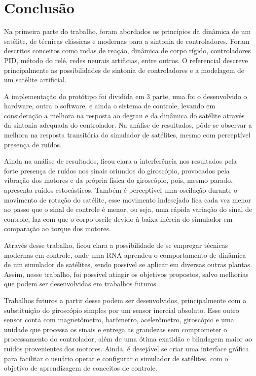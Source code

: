 \chapter[Conclusão]{Conclusão}

Na primeira parte do trabalho, foram abordados os princípios da dinâmica de um satélite, de técnicas clássicas e modernas para a sintonia de controladores. Foram descritos conceitos como rodas de reação, dinâmica de corpo rígido, controladores PID, método do relé, redes neurais artificias, entre outros. O referencial descreve principalmente as possibilidades de sintonia de controladores e a modelagem de um satélite artificial.

A implementação do protótipo foi dividida em 3 parte, uma foi o desenvolvido o hardware, outra o software, e ainda o sistema de controle, levando em consideração a melhora na resposta ao degrau e da dinâmica do satélite através da sintonia adequada do controlador. Na análise de resultados, pôde-se observar a melhora na resposta transitória do simulador de satélites, mesmo com perceptível presença de ruídos.

Ainda na análise de resultados, ficou clara a interferência nos resultados pela forte presença de ruídos nos sinais oriundos do giroscópio, provocados pela vibração dos motores e da própria física do giroscópio, pois, mesmo parado, apresenta ruídos estocásticos. Também é perceptível uma oscilação durante o movimento de rotação do satélite, esse movimento indesejado fica cada vez menor ao passo que o sinal de controle é menor, ou seja, uma rápida variação do sinal de controle, faz com que o corpo oscile devido à baixa inércia do simulador em comparação ao torque dos motores.

Através desse trabalho, ficou clara a possibilidade de se empregar técnicas modernas em controle, onde uma RNA aprendeu o comportamento de dinâmica de um simulador de satélites, sendo possível se aplicar em diversas outras plantas. Assim, nesse trabalho, foi possível atingir os objetivos propostos, salvo melhorias que podem ser desenvolvidas em trabalhos futuros.

Trabalhos futuros a partir desse podem ser desenvolvidos, principalmente com a substituição do giroscópio simples por um sensor inercial absoluto. Esse outro sensor conta com magnetômetro, barômetro, acelerômetro, giroscópio e uma unidade que processa os sinais e entrega as grandezas sem comprometer o processamento do controlador, além de uma ótima exatidão e blindagem maior ao ruídos provenientes dos motores. Ainda, é desejável se criar uma interface gráfica para facilitar o usuário operar e configurar o simulador de satélites, com o objetivo de aprendizagem de conceitos de controle. 


